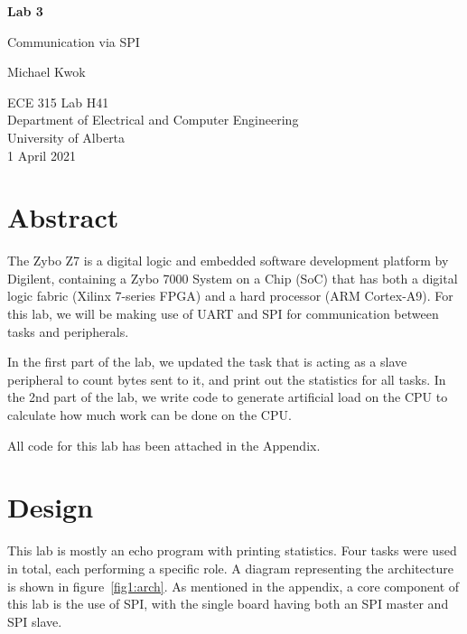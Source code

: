 \documentclass{article}
\begin{document}
\begin{titlepage}
    \begin{center}
        \vspace*{1cm}

        \textbf{\Large{Lab 3}}

        \vspace{0.5cm}

        \LARGE{Communication via SPI}
        \vspace{1.5cm}

        Michael Kwok

        \vfill
        \Large{ECE 315 Lab H41\\
            Department of Electrical and Computer Engineering\\
            University of Alberta\\
            1 April 2021}
    \end{center}
\end{titlepage}
\newpage
\tableofcontents
\thispagestyle{empty}
\newpage
\section{Abstract}
The Zybo Z7 is a digital logic and embedded software development platform by Digilent, containing a Zybo 7000 System on a Chip (SoC) that has both a digital logic fabric (Xilinx 7-series FPGA) and a hard processor (ARM Cortex-A9). For this lab, we will be making use of UART and SPI for communication between tasks and peripherals.\@

In the first part of the lab, we updated the task that is acting as a slave peripheral to count bytes sent to it, and print out the statistics for all tasks. In the 2nd part of the lab, we write code to generate artificial load on the CPU to calculate how much work can be done on the CPU.\@

All code for this lab has been attached in the Appendix.

\section{Design}

This lab is mostly an echo program with printing statistics. Four tasks were used in total, each performing a specific role. A diagram representing the architecture is shown in figure~\ref{fig1:arch}. As mentioned in the appendix, a core component of this lab is the use of SPI, with the single board having both an SPI master and SPI slave.
\end{document}
